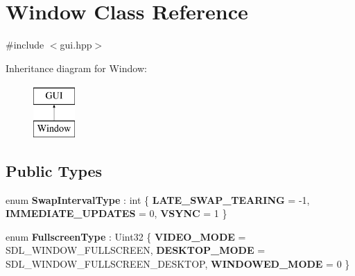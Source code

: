 \hypertarget{class_window}{}\section{Window Class Reference}
\label{class_window}


{\ttfamily \#include $<$gui.\+hpp$>$}

Inheritance diagram for Window\+:\begin{figure}[H]
\begin{center}
\leavevmode
\includegraphics[height=2.000000cm]{class_window}
\end{center}
\end{figure}
\subsection*{Public Types}
\begin{DoxyCompactItemize}
\item 
\mbox{\label{class_window_a2ca5739e956b8f5fec8f4e8a9fb1dd92}} 
enum {\bfseries Swap\+Interval\+Type} \+: int \{ {\bfseries L\+A\+T\+E\+\_\+\+S\+W\+A\+P\+\_\+\+T\+E\+A\+R\+I\+NG} = -\/1, 
{\bfseries I\+M\+M\+E\+D\+I\+A\+T\+E\+\_\+\+U\+P\+D\+A\+T\+ES} = 0, 
{\bfseries V\+S\+Y\+NC} = 1
 \}
\item 
\mbox{\label{class_window_a124fc3e2e9aaf01b362fac1f8896e532}} 
enum {\bfseries Fullscreen\+Type} \+: Uint32 \{ {\bfseries V\+I\+D\+E\+O\+\_\+\+M\+O\+DE} = S\+D\+L\+\_\+\+W\+I\+N\+D\+O\+W\+\_\+\+F\+U\+L\+L\+S\+C\+R\+E\+EN, 
{\bfseries D\+E\+S\+K\+T\+O\+P\+\_\+\+M\+O\+DE} = S\+D\+L\+\_\+\+W\+I\+N\+D\+O\+W\+\_\+\+F\+U\+L\+L\+S\+C\+R\+E\+E\+N\+\_\+\+D\+E\+S\+K\+T\+OP, 
{\bfseries W\+I\+N\+D\+O\+W\+E\+D\+\_\+\+M\+O\+DE} = 0
 \}
\end{DoxyCompactItemize}
